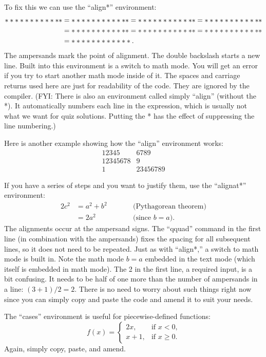 \documentclass{article}
\begin{document}
To fix this we can use the ``align*'' environment:
\begin{align*}
\ast\ast\ast\ast\ast\ast\ast\ast\ast\ast\ast\ast &=\ast\ast\ast\ast\ast\ast\ast\ast\ast\ast\ast\ast=\ast\ast\ast\ast\ast\ast\ast\ast\ast\ast\ast\ast=\ast\ast\ast\ast\ast\ast\ast\ast\ast\ast\ast\ast\\
      &=\ast\ast\ast\ast\ast\ast\ast\ast\ast\ast\ast\ast=\ast\ast\ast\ast\ast\ast\ast\ast\ast\ast\ast\ast=\ast\ast\ast\ast\ast\ast\ast\ast\ast\ast\ast\ast\\
      &=\ast\ast\ast\ast\ast\ast\ast\ast\ast\ast\ast\ast.
\end{align*}
The ampersands mark the point of alignment.  The double backslash starts a new line. Built into this environment is a switch to
math mode. You will get an error if you try to start another math mode inside of it.   The spaces and carriage returns used here
are just for readability of the code. They are ignored by the compiler.  (FYI: There is also an environment called simply ``align''
(without the *).  It automatically numbers each line in the expression, which is usually not what we want for quiz solutions.
Putting the * has the effect of suppressing the line numbering.)

Here is another example showing how the ``align'' environment works:
\begin{align*}
12345&6789\\
12345678&9\\
1&23456789
\end{align*}

If you have a series of steps and you want to justify them, use the ``alignat*'' environment:
\begin{alignat*}{2}
c^2 &= a^2+b^2 &\qquad &\text{(Pythagorean theorem)}\\
    &= 2a^2    &       &\text{(since \(b=a\))}.
\end{alignat*}
The alignments occur at the ampersand signs.  The ``qquad'' command in the first line (in combination with the ampersands) fixes
the spacing for all subsequent lines, so it does not need to be repeated.  Just as with ``align*,'' a switch to math mode is built
in.  Note the math mode \(b=a\) embedded in the text mode (which itself is embedded in math mode).  The {2} in the first line, a
required input, is a bit confusing.  It needs to be half of one more than the number of ampersands in a line: \((3+1)/2=2\).  There
is no need to worry about such things right now since you can simply copy and paste the code and amend it to suit your needs.

The ``cases'' environment is useful for piecewise-defined functions:
\[
f(x)=
\begin{cases}
2x,   &\text{if \(x<0\),}\\
x+1,  &\text{if \(x\ge0\).}
\end{cases}
\]
Again, simply copy, paste, and amend.
\end{document}
